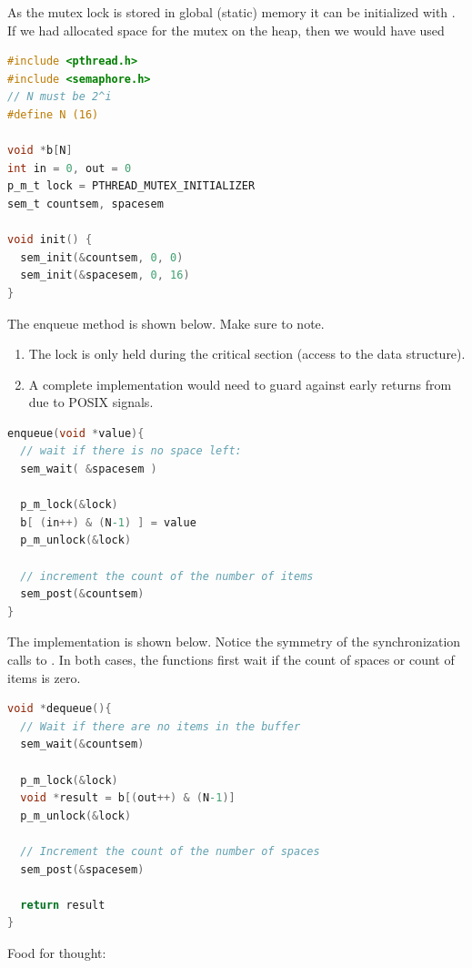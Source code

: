 As the mutex lock is stored in global (static) memory it can be initialized with .
If we had allocated space for the mutex on the heap, then we would have used 

\begin{lstlisting}[language=C]
#include <pthread.h>
#include <semaphore.h>
// N must be 2^i
#define N (16)

void *b[N]
int in = 0, out = 0
p_m_t lock = PTHREAD_MUTEX_INITIALIZER
sem_t countsem, spacesem

void init() {
  sem_init(&countsem, 0, 0)
  sem_init(&spacesem, 0, 16)
}
\end{lstlisting}

The enqueue method is shown below.
Make sure to note.

\begin{enumerate}
\item The lock is only held during the critical section (access to the data structure).
\item A complete implementation would need to guard against early returns from  due to POSIX signals.
\end{enumerate}

\begin{lstlisting}[language=C]
enqueue(void *value){
  // wait if there is no space left:
  sem_wait( &spacesem )

  p_m_lock(&lock)
  b[ (in++) & (N-1) ] = value
  p_m_unlock(&lock)

  // increment the count of the number of items
  sem_post(&countsem)
}
\end{lstlisting}

The  implementation is shown below.
Notice the symmetry of the synchronization calls to .
In both cases, the functions first wait if the count of spaces or count of items is zero.

\begin{lstlisting}[language=C]
void *dequeue(){
  // Wait if there are no items in the buffer
  sem_wait(&countsem)

  p_m_lock(&lock)
  void *result = b[(out++) & (N-1)]
  p_m_unlock(&lock)

  // Increment the count of the number of spaces
  sem_post(&spacesem)

  return result
}
\end{lstlisting}

Food for thought:

